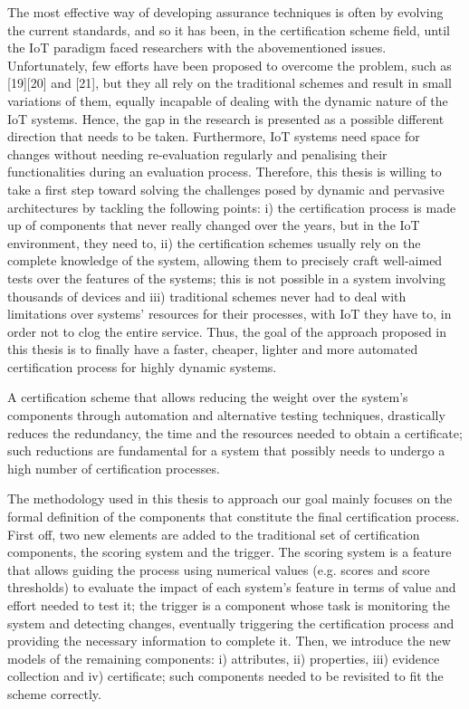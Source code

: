 The most effective way of developing assurance techniques is often by evolving the current standards, and so it has been, in the certification scheme field, until the IoT paradigm faced researchers with the abovementioned issues. Unfortunately, few efforts have been proposed to overcome the problem, such as [19][20] and [21], but they all rely on the traditional schemes and result in small variations of them, equally incapable of dealing with the dynamic nature of the IoT systems. Hence, the gap in the research is presented as a possible different direction that needs to be taken. Furthermore, IoT systems need space for changes without needing re-evaluation regularly and penalising their functionalities during an evaluation process. Therefore, this thesis is willing to take a first step toward solving the challenges posed by dynamic and pervasive architectures by tackling the following points: i) the certification process is made up of components that never really changed over the years, but in the IoT environment, they need to, ii) the certification schemes usually rely on the complete knowledge of the system, allowing them to precisely craft well-aimed tests over the features of the systems; this is not possible in a system involving thousands of devices and iii) traditional schemes never had to deal with limitations over systems' resources for their processes, with IoT they have to, in order not to clog the entire service. Thus, the goal of the approach proposed in this thesis is to finally have a faster, cheaper, lighter and more automated certification process for highly dynamic systems.

A certification scheme that allows reducing the weight over the system's components through automation and alternative testing techniques, drastically reduces the redundancy, the time and the resources needed to obtain a certificate; such reductions are fundamental for a system that possibly needs to undergo a high number of certification processes.

The methodology used in this thesis to approach our goal mainly focuses on the formal definition of the components that constitute the final certification process. First off, two new elements are added to the traditional set of certification components, the scoring system and the trigger. The scoring system is a feature that allows guiding the process using numerical values (e.g. scores and score thresholds) to evaluate the impact of each system’s feature in terms of value and effort needed to test it; the trigger is a component whose task is monitoring the system and detecting changes, eventually triggering the certification process and providing the necessary information to complete it. Then, we introduce the new models of the remaining components: i) attributes, ii) properties, iii) evidence collection and iv) certificate; such components needed to be revisited to fit the scheme correctly.

